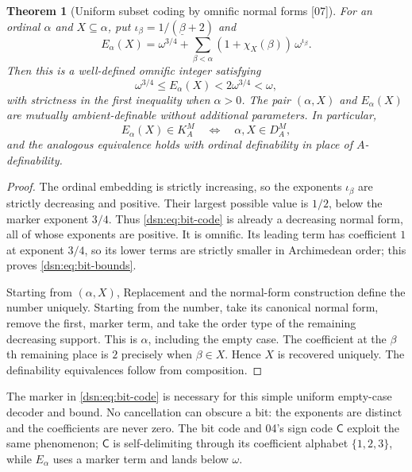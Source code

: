 \documentclass[11pt,a4paper]{article}
\numberwithin{equation}{section}
\newtheorem{theorem}{Theorem}[section]
\theoremstyle{definition}
\theoremstyle{remark}
\newcommand{\Code}{\mathsf C}
\newcommand{\src}[1]{\textup{\textsf{\small[#1]}}}
\begin{document}
\begin{theorem}[Uniform subset coding by omnific normal forms \src{07}]\label{dsn:thm:bit-code}
For an ordinal $\alpha$ and $X\subseteq\alpha$, put $\iota_\beta=
1/(\underline\beta+2)$ and
\begin{equation}\label{dsn:eq:bit-code}
 E_\alpha(X)=\omega^{3/4}
  +\sum_{\beta<\alpha}(1+\chi_X(\beta))\,\omega^{\iota_\beta}.
\end{equation}
Then this is a well-defined omnific integer satisfying
\begin{equation}\label{dsn:eq:bit-bounds}
 \omega^{3/4}\le E_\alpha(X)<2\omega^{3/4}<\omega,
\end{equation}
with strictness in the first inequality when $\alpha>0$. The pair
$(\alpha,X)$ and $E_\alpha(X)$ are mutually ambient-definable without
additional parameters. In particular,
\[
 E_\alpha(X)\in K^M_A\quad\Longleftrightarrow\quad \alpha,X\in D^M_A,
\]
and the analogous equivalence holds with ordinal definability in place of
$A$-definability.
\end{theorem}
\begin{proof}
The ordinal embedding is strictly increasing, so the exponents
$\iota_\beta$ are strictly decreasing and positive. Their largest possible
value is $1/2$, below the marker exponent $3/4$. Thus \eqref{dsn:eq:bit-code}
is already a decreasing normal form, all of whose exponents are positive.
It is omnific. Its leading term has coefficient $1$ at exponent $3/4$, so
its lower terms are strictly smaller in Archimedean order; this proves
\eqref{dsn:eq:bit-bounds}.

Starting from $(\alpha,X)$, Replacement and the normal-form construction
define the number uniquely. Starting from the number, take its canonical
normal form, remove the first, marker term, and take the order type of the
remaining decreasing support. This is $\alpha$, including the empty case.
The coefficient at the $\beta$th remaining place is $2$ precisely when
$\beta\in X$. Hence $X$ is recovered uniquely. The definability
equivalences follow from composition.
\end{proof}

The marker in \eqref{dsn:eq:bit-code} is necessary for this simple uniform
empty-case decoder and bound. No cancellation can obscure a bit: the
exponents are distinct and the coefficients are never zero. The bit code
and 04's sign code $\Code$ exploit the same phenomenon; $\Code$ is
self-delimiting through its coefficient alphabet $\{1,2,3\}$, while
$E_\alpha$ uses a marker term and lands below $\omega$.
\end{document}
